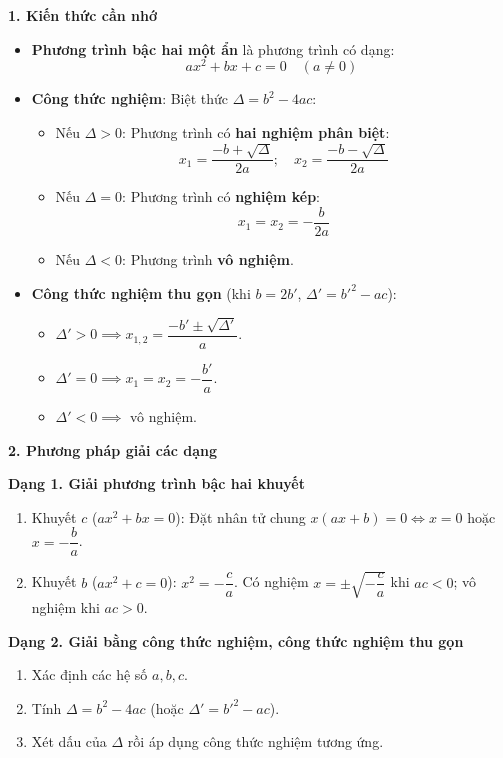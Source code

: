 \textbf{1. Kiến thức cần nhớ}
\begin{itemize}
\item \textbf{Phương trình bậc hai một ẩn} là phương trình có dạng:
$$\boxed{ax^2 + bx + c = 0\quad (a \ne 0)}$$
\item \textbf{Công thức nghiệm}: Biệt thức $\Delta = b^2 - 4ac$:
\begin{itemize}
\item Nếu $\Delta > 0$: Phương trình có \textbf{hai nghiệm phân biệt}:
$$\boxed{x_1 = \dfrac{-b + \sqrt{\Delta}}{2a};\quad x_2 = \dfrac{-b - \sqrt{\Delta}}{2a}}$$
\item Nếu $\Delta = 0$: Phương trình có \textbf{nghiệm kép}:
$$\boxed{x_1 = x_2 = -\dfrac{b}{2a}}$$
\item Nếu $\Delta < 0$: Phương trình \textbf{vô nghiệm}.
\end{itemize}
\item \textbf{Công thức nghiệm thu gọn} (khi $b = 2b'$, $\Delta' = b'^2 - ac$):
\begin{itemize}
\item $\Delta' > 0 \implies x_{1,2} = \dfrac{-b' \pm \sqrt{\Delta'}}{a}$.
\item $\Delta' = 0 \implies x_1 = x_2 = -\dfrac{b'}{a}$.
\item $\Delta' < 0 \implies$ vô nghiệm.
\end{itemize}
\end{itemize}

\textbf{2. Phương pháp giải các dạng}

\textbf{Dạng 1. Giải phương trình bậc hai khuyết}
\begin{enumerate}
\item Khuyết $c$ ($ax^2 + bx = 0$): Đặt nhân tử chung $x(ax + b) = 0 \iff x = 0$ hoặc $x = -\dfrac{b}{a}$.
\item Khuyết $b$ ($ax^2 + c = 0$): $x^2 = -\dfrac{c}{a}$. Có nghiệm $x = \pm\sqrt{-\dfrac{c}{a}}$ khi $ac < 0$; vô nghiệm khi $ac > 0$.
\end{enumerate}

\textbf{Dạng 2. Giải bằng công thức nghiệm, công thức nghiệm thu gọn}
\begin{enumerate}
\item Xác định các hệ số $a, b, c$.
\item Tính $\Delta = b^2 - 4ac$ (hoặc $\Delta' = b'^2 - ac$).
\item Xét dấu của $\Delta$ rồi áp dụng công thức nghiệm tương ứng.
\end{enumerate}

